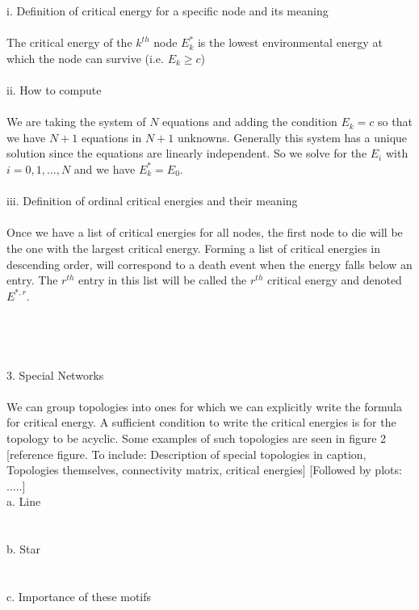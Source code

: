 \documentclass{amsart}
\theoremstyle{plain}
\numberwithin{equation}{section}
\begin{document}
	i. Definition of critical energy for a specific node and its meaning\\
	\\
	The critical energy of the $k^{th}$ node $E^*_k$ is the lowest environmental energy at which the node can survive (i.e. $E_k \geq c$)\\
	\\
	ii. How to compute\\
	\\
	We are taking the system of $N$ equations and adding the condition $E_k=c$ so that we have $N+1$ equations in $N+1$ unknowns. Generally this system has a unique solution since the equations are linearly independent. So we solve for the $E_i$ with $i=0,1,...,N$ and we have $E^*_k=E_0$.\\
	\\
	iii. Definition of ordinal critical energies and their meaning\\
	\\
	Once we have a list of critical energies for all nodes, the first node to die will be the one with the largest critical energy. Forming a list of critical energies in descending order, will correspond to a death event when the energy falls below an entry. The $r^{th}$ entry in this list will be called the $r^{th}$ critical energy and denoted $E^{*,r}$.\\
	\\
	\\
	\\
	\\
3. Special Networks\\
\\
We can group topologies into ones for which we can explicitly write the formula for critical energy. A sufficient condition to write the critical energies is for the topology to be acyclic. Some examples of such topologies are seen in figure 2 [reference figure. To include: Description of special topologies in caption, Topologies themselves, connectivity matrix, critical energies] 
[Followed by plots: .....]
\\
 a. Line\\
\\
\\
 b. Star\\
\\
\\
 c. Importance of these motifs\\
\\
\\
\\
\\
\end{document}
